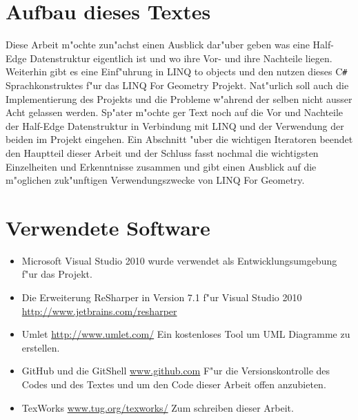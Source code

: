 \documentclass[pagesize, paper=a4, fontsize=12pt,titlepage=true, headings=small, headnosepline, abstractoff, liststotoc, nochapterprefix, plainheadsepline]{scrreprt}
\newcommand{\CSS}{C\texttt{\# }}
\newcommand{\LFG}{LINQ For Geometry}
\newcommand{\LFGS}{LINQ For Geometry }
\newcommand{\HES}{Half-Edge Datenstruktur }
\begin{document}
	\section{Aufbau dieses Textes}
	Diese Arbeit m"ochte zun"achst einen Ausblick dar"uber geben was eine \HES eigentlich ist und wo ihre Vor- und ihre Nachteile liegen. Weiterhin gibt es eine Einf"uhrung in LINQ to objects und den nutzen dieses \CSS Sprachkonstruktes f"ur das \LFGS Projekt. Nat"urlich soll auch die Implementierung des Projekts und die Probleme w"ahrend der selben nicht ausser Acht gelassen werden. Sp"ater m"ochte ger Text noch auf die Vor und Nachteile der \HES in Verbindung mit LINQ und der Verwendung der beiden im Projekt eingehen. Ein Abschnitt "uber die wichtigen Iteratoren beendet den Hauptteil dieser Arbeit und der Schluss fasst nochmal die wichtigsten Einzelheiten und Erkenntnisse zusammen und gibt einen Ausblick auf die m"oglichen zuk"unftigen Verwendungszwecke von \LFG.
	\section {Verwendete Software}
\begin{itemize}
\item Microsoft Visual Studio 2010 \newline wurde verwendet als Entwicklungsumgebung f"ur das Projekt.
\item Die Erweiterung ReSharper in Version 7.1 f"ur Visual Studio 2010 \url{http://www.jetbrains.com/resharper}
\item Umlet \url{http://www.umlet.com/} \newline Ein kostenloses Tool um UML Diagramme zu erstellen.
\item GitHub und die GitShell \url{www.github.com} \newline F"ur die Versionskontrolle des Codes und des Textes und um den Code dieser Arbeit offen anzubieten.
\item TexWorks \url{www.tug.org/texworks/} \newline Zum schreiben dieser Arbeit.
\end{itemize}
\end{document}
